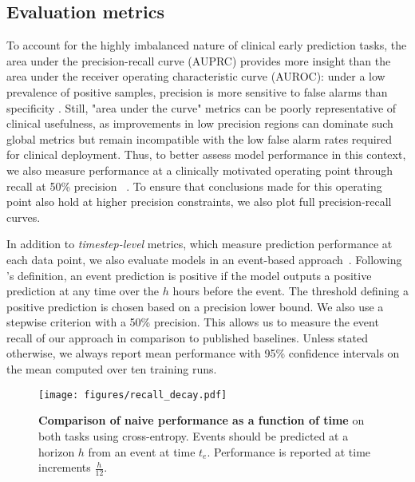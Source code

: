 \documentclass[nohyperref]{article}
\begin{document}
\subsection{Evaluation metrics}
To account for the highly imbalanced nature of clinical early prediction tasks, the area under the precision-recall curve (AUPRC) provides more insight than the area under the receiver operating characteristic curve (AUROC): under a low prevalence of positive samples, precision is more sensitive to false alarms than specificity \citep{saito2015precision}. Still, "area under the curve" metrics can be poorly representative of clinical usefulness, as improvements in low precision regions can dominate such global metrics but remain incompatible with the low false alarm rates required for clinical deployment. Thus, to better assess model performance in this context, we also measure performance at a clinically motivated operating point through recall at 50\% precision ~\cite{tomavsev2021}. To ensure that conclusions made for this operating point also hold at higher precision constraints, we also plot full precision-recall curves. 

In addition to \textit{timestep-level} metrics, which measure prediction performance at each data point, we also evaluate models in an event-based approach~\cite{hyland2020,tomavsev2019}. Following \citet{tomavsev2019}'s definition, an event prediction is positive if the model outputs a positive prediction at any time over the $h$ hours before the event. The threshold defining a positive prediction is chosen based on a precision lower bound. We also use a stepwise criterion with a 50\% precision. This allows us to measure the event recall of our approach in comparison to published baselines. Unless stated otherwise, we always report mean performance with 95\% confidence intervals on the mean computed over ten training runs.

\begin{figure}[hbt]
    \centering
    \texttt{[image: figures/recall\_decay.pdf]}
    \caption{\textbf{Comparison of naive performance as a function of time} on both tasks using cross-entropy. Events should be predicted at a horizon $h$ from an event at time $t_e$. Performance is reported at time increments $\frac{h}{12}$.}
    \label{fig:tasks_perf_v_time}
\end{figure}
\end{document}
